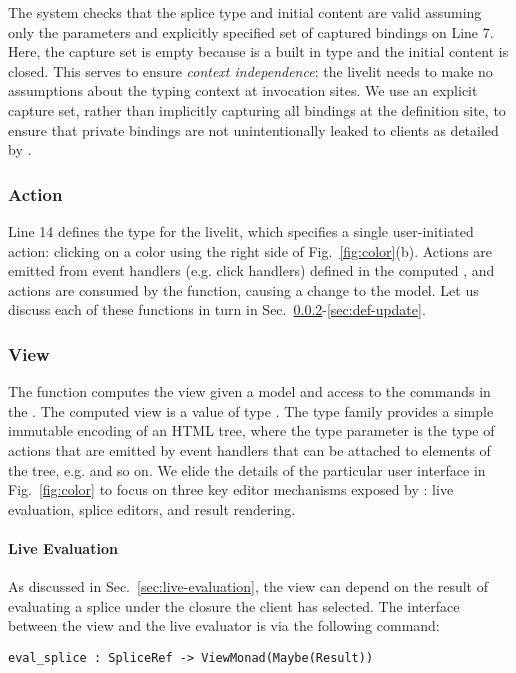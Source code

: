 The system checks that the splice type and initial content are valid 
assuming only the parameters and explicitly specified set of captured bindings on Line 7.
Here, the capture set is empty because  is a built in type
and the initial content is closed. 
This serves to ensure \emph{context independence}: the livelit needs to make no 
assumptions about the typing context at invocation sites.
We use an explicit capture set, rather than implicitly capturing all bindings 
at the definition site, 
to ensure that private bindings are not unintentionally  
leaked to clients as detailed by \citet{TLMs}.

\subsubsection{Action}
Line 14 defines the  type for the  livelit, which 
specifies a single user-initiated action: clicking on a color using
the right side of Fig.~\ref{fig:color}(b). Actions are emitted
from event handlers (e.g. click handlers) defined in the computed , 
and actions are consumed by the  function, causing a change to the model. 
Let us discuss each of these functions in turn in Sec.~\ref{sec:def-view}-\ref{sec:def-update}.

\subsubsection{View}\label{sec:def-view}
The  function computes the view given a model and access to the commands in 
the . The computed view is a value of type .  
The type family  provides a simple immutable
encoding of an HTML tree, where the type parameter  is the type of actions that 
are emitted by event handlers that can be attached to elements of the tree, e.g.
 and so on. 
We elide the details of the particular user interface in Fig.~\ref{fig:color}
to focus on three key editor mechanisms exposed by : live evaluation,
splice editors, and result rendering.

\paragraph{Live Evaluation}
\label{sec:live-evaluation-def}
As discussed in Sec.~\ref{sec:live-evaluation}, 
the view can depend on the result of evaluating a splice 
under the closure the client has selected.
The interface between the view and the live evaluator 
is via the 
following command:
\begin{lstlisting}[numbers=none,xleftmargin=0cm]
eval_splice : SpliceRef -> ViewMonad(Maybe(Result))
\end{lstlisting}

